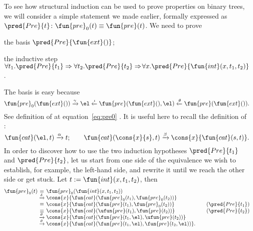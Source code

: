 To see how structural induction can be used to prove properties on
binary trees, we will consider a simple statement we made earlier,
formally expressed as \(\pred{Pre}{t} \colon \fun{pre}_0(t) \equiv
\fun{pre}(t)\).
We need to prove
\begin{itemize*}

  \item the basis \(\pred{Pre}{\fun{ext}()}\);

  \item the inductive step \(\forall t_1.\pred{Pre}{t_1} \Rightarrow
    \forall t_2.\pred{Pre}{t_2} \Rightarrow \! \forall
    x.\pred{Pre}{\fun{int}(x,t_1,t_2)}\).

\end{itemize*}
The basis is easy because
\begin{equation*}
  \fun{pre}_0(\fun{ext}())
  \xrightarrow{\smash{\gamma}} \el \xleftarrow{\smash{\iota}}
  \fun{pre}(\fun{ext}(),\el) \xleftarrow{\smash{\theta}}
  \fun{pre}(\fun{ext}()).
\end{equation*}
See definition of  at
equation~\eqref{eq:pre0} . It is useful here to
recall the definition of :
\begin{equation*}
\fun{cat}(\el,t) \xrightarrow{\smash{\alpha}} t;
\qquad
\fun{cat}(\cons{x}{s},t) \xrightarrow{\smash{\beta}}
\cons{x}{\fun{cat}(s,t)}.
\end{equation*}
In order to discover how to use the two induction hypotheses
\(\pred{Pre}{t_1}\) and \(\pred{Pre}{t_2}\),
let us start from one side of the equivalence we wish to establish,
for example, the left\hyp{}hand side, and rewrite it until we reach
the other side or get stuck. Let \(t := \fun{int}(x,t_1,t_2)\), then
\begin{equation*}
\begin{array}{@{}r@{\;}c@{\;}l@{\qquad}r@{}}
\fun{pre}_0(t)
& = & \fun{pre}_0(\fun{int}(x,t_1,t_2)) \\
& \xrightarrow{\smash{\delta}}
& \cons{x}{\fun{cat}(\fun{pre}_0(t_1), \fun{pre}_0(t_2))}\\
& \equiv & \cons{x}{\fun{cat}(\fun{pre}(t_1), \fun{pre}_0(t_2))}
& (\pred{Pre}{t_1})\\
& \equiv & \cons{x}{\fun{cat}(\ufun{pre}(t_1), \fun{pre}(t_2))}
& (\pred{Pre}{t_2})\\
& \xrightarrow{\smash{\theta}}
& \cons{x}{\fun{cat}(\fun{pre}(t_1,\el), \ufun{pre}(t_2))}\\
& \xrightarrow{\smash{\theta}}
& \cons{x}{\fun{cat}(\fun{pre}(t_1,\el), \fun{pre}(t_2,\el))}.
\end{array}
\end{equation*}
